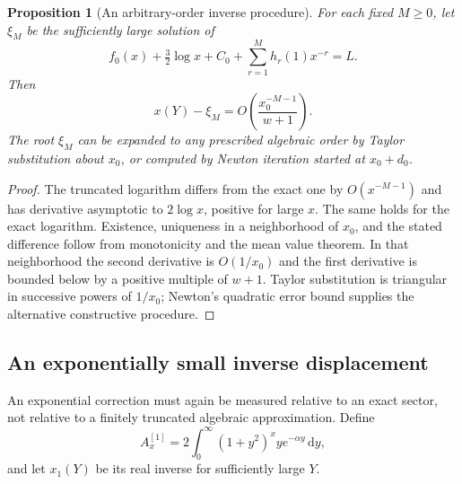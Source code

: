 \documentclass[11pt]{article}
\newtheorem{proposition}[theorem]{Proposition}
\theoremstyle{definition}
\theoremstyle{remark}
\newcommand{\dd}{\,\mathrm d}
\begin{document}
\begin{proposition}[An arbitrary-order inverse procedure]\label{pou:prop:inverseall}
For each fixed $M\ge0$, let $\xi_M$ be the sufficiently large solution of
\[
 f_0(x)+\tfrac32\log x+C_0+\sum_{r=1}^{M}h_r(1)x^{-r}=L.
\]
Then
\[
 x(Y)-\xi_M=O\left(\frac{x_0^{-M-1}}{w+1}\right).
\]
The root $\xi_M$ can be expanded to any prescribed algebraic order by
Taylor substitution about $x_0$, or computed by Newton iteration started
at $x_0+d_0$.
\end{proposition}
\begin{proof}
The truncated logarithm differs from the exact one by $O(x^{-M-1})$
and has derivative asymptotic to $2\log x$, positive for large $x$.
The same holds for the exact logarithm.  Existence, uniqueness in a
neighborhood of $x_0$, and the stated difference follow from monotonicity
and the mean value theorem.  In that neighborhood the second derivative
is $O(1/x_0)$ and the first derivative is bounded below by a positive
multiple of $w+1$.  Taylor substitution is triangular in successive
powers of $1/x_0$; Newton's quadratic error bound supplies the alternative
constructive procedure.
\end{proof}

\subsection{An exponentially small inverse displacement}

An exponential correction must again be measured relative to an exact
sector, not relative to a finitely truncated algebraic approximation.
Define
\begin{equation}\label{pou:eq:firstreal}
 A_x^{[1]}=2\int_0^\infty(1+y^2)^x y e^{-\alpha y}\dd y,
\end{equation}
and let $x_1(Y)$ be its real inverse for sufficiently large $Y$.
\end{document}
